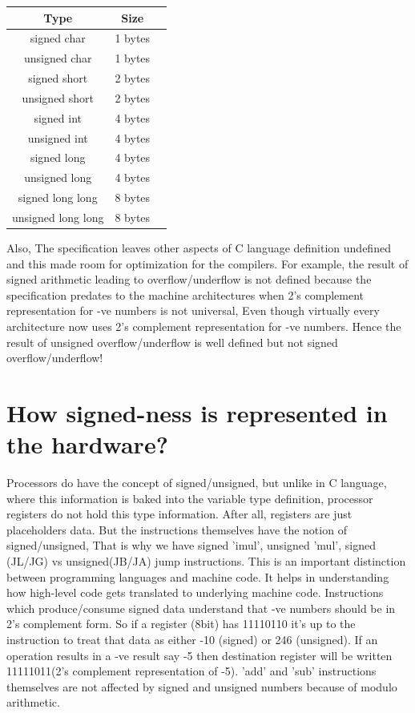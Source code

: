\documentclass{article}
\begin{document}
\begin{center}
\begin{tabular}{|c|c|c|}
 Type       &Size       \\
 \hline
 signed char         & 1 bytes \\
 unsigned char       & 1 bytes \\
 signed short        & 2 bytes \\
 unsigned short      & 2 bytes \\
 signed int          & 4 bytes \\
 unsigned int        & 4 bytes \\
 signed long         & 4 bytes \\
 unsigned long       & 4 bytes \\
 signed long long    & 8 bytes \\
 unsigned long long  & 8 bytes
\end{tabular}
\end{center}

Also, The specification leaves other aspects of C language definition undefined
and this made room for optimization for the compilers. For example, the result
of signed arithmetic leading to overflow/underflow is not defined because the
specification predates to the machine architectures when 2's complement
representation for -ve numbers is not universal, Even though virtually every
architecture now uses 2's complement representation for -ve numbers. Hence the
result of unsigned overflow/underflow is well defined but not signed
overflow/underflow!

\section{How signed-ness is represented in the hardware?}
Processors do have the concept of signed/unsigned, but unlike in C language,
where this information is baked into the variable type definition, processor
registers do not hold this type information. After all, registers are just
placeholders data. But the instructions themselves have the notion of
signed/unsigned, That is why we have signed 'imul', unsigned 'mul', signed
(JL/JG) vs unsigned(JB/JA) jump instructions. This is an important distinction
between programming languages and machine code. It helps in understanding how
high-level code gets translated to underlying machine code. Instructions which
produce/consume signed data understand that -ve numbers should be in 2's
complement form. So if a register (8bit) has 11110110 it's up to the instruction
to treat that data as either -10 (signed) or 246 (unsigned). If an operation
results in a -ve result say -5 then destination register will be written
11111011(2's complement representation of -5). 'add' and 'sub' instructions
themselves are not affected by signed and unsigned numbers because of modulo
arithmetic.
\end{document}
